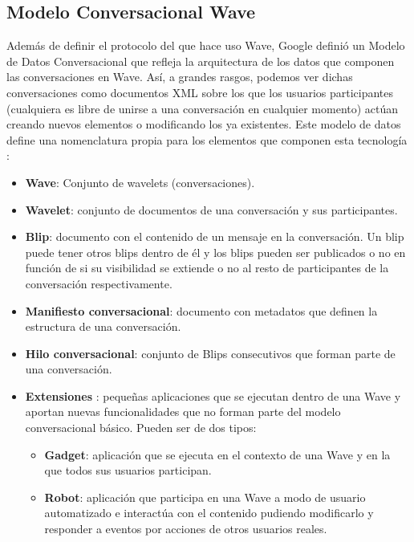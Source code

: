     \subsection{Modelo Conversacional Wave}\label{ssec:waveModel}
    
    Además de definir el protocolo del que hace uso Wave, Google definió un Modelo de Datos Conversacional \cite{ref:wave_conversation_model} que refleja la arquitectura de los datos que componen las conversaciones en Wave. Así, a grandes rasgos, podemos ver dichas conversaciones como documentos XML sobre los que los usuarios participantes (cualquiera es libre de unirse a una conversación en cualquier momento) actúan creando nuevos elementos o modificando los ya existentes. Este modelo de datos define una nomenclatura propia para los elementos que componen esta tecnología \cite{ref:wave_api_overview} \cite{ref:wave_white_paper}:
    
      \begin{itemize}
	\item \textbf{Wave}: Conjunto de wavelets (conversaciones).
	\item \textbf{Wavelet}: conjunto de documentos de una conversación y sus participantes.
	\item \textbf{Blip}: documento con el contenido de un mensaje en la conversación. Un blip puede tener otros blips dentro de él y los blips pueden ser publicados o no en función de si su visibilidad se extiende o no al resto de participantes de la conversación respectivamente.
	\item \textbf{Manifiesto conversacional}: documento con metadatos que definen la estructura de una conversación. 
	\item \textbf{Hilo conversacional}: conjunto de Blips consecutivos que forman parte de una conversación.
	\item \textbf{Extensiones} \cite{ref:wave_extensions}: pequeñas aplicaciones que se ejecutan dentro de una Wave y aportan nuevas funcionalidades que no forman parte del modelo conversacional básico. Pueden ser de dos tipos:
	  \begin{itemize}
	    \item \textbf{Gadget}: aplicación que se ejecuta en el contexto de una Wave y en la que todos sus usuarios participan.
	    \item \textbf{Robot}: aplicación que participa en una Wave a modo de usuario automatizado e interactúa con el contenido pudiendo modificarlo y responder a eventos por acciones de otros usuarios reales.
	  \end{itemize}
      \end{itemize}
      
